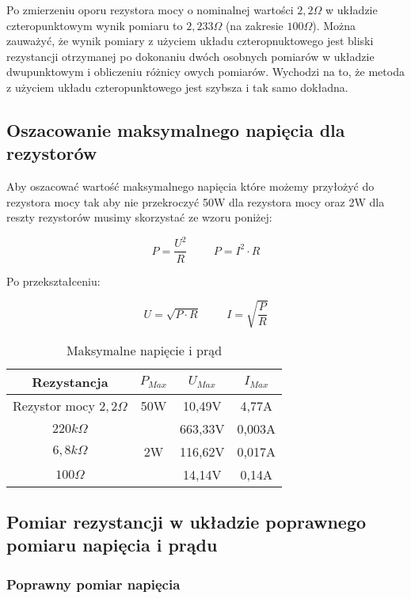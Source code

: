 Po zmierzeniu oporu rezystora mocy o nominalnej wartości $2,2\Omega$ w układzie czteropunktowym wynik pomiaru to $2,233\Omega$ (na zakresie $100\Omega$).
Można zauważyć, że wynik pomiary z użyciem układu czteropnuktowego jest bliski rezystancji otrzymanej po dokonaniu dwóch osobnych pomiarów w układzie dwupunktowym i obliczeniu różnicy owych pomiarów.
Wychodzi na to, że metoda z użyciem układu czteropunktowego jest szybsza i tak samo dokładna.

\subsection{Oszacowanie maksymalnego napięcia dla rezystorów} %

Aby oszacować wartość maksymalnego napięcia które możemy przyłożyć do rezystora mocy tak aby nie przekroczyć 50W dla rezystora mocy oraz 2W dla reszty rezystorów musimy skorzystać ze wzoru poniżej:

$$P=\frac{U^2}{R} \hspace{1cm} P=I^2 \cdot R$$

Po przekształceniu:

$$U=\sqrt{P \cdot R} \hspace{1cm} I=\sqrt{\frac{P}{R}}$$

\begin{table}[!h]
    \centering
    \begin{tabular}{|c|c|c|c|}\hline
        Rezystancja & $P_{Max}$ & $U_{Max}$ & $I_{Max}$\\ \hline
       Rezystor mocy $2,2\Omega$  & 50W & 10,49V & 4,77A \\ \hline
        $220k\Omega$ & \multirow{3}{*}{2W} & 663,33V & 0,003A \\ 
        $6,8k\Omega$ &  & 116,62V & 0,017A \\ 
        $100\Omega$ &  & 14,14V & 0,14A \\ \hline
    \end{tabular}
    \caption{Maksymalne napięcie i prąd}
    \label{tab:my_label}
\end{table}

\newpage
\subsection{Pomiar rezystancji w układzie poprawnego pomiaru napięcia i prądu} %
\subsubsection{Poprawny pomiar napięcia}

